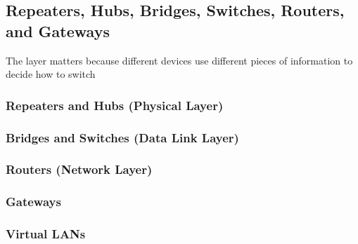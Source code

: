 

\subsection{Repeaters, Hubs, Bridges, Switches, Routers, and Gateways}%
The layer matters because different devices use different pieces of information to decide how to switch

\subsubsection{Repeaters and Hubs (Physical Layer)}

\subsubsection{Bridges and Switches (Data Link Layer)}

\subsubsection{Routers (Network Layer)}

\subsubsection{Gateways}

\subsubsection{Virtual LANs}